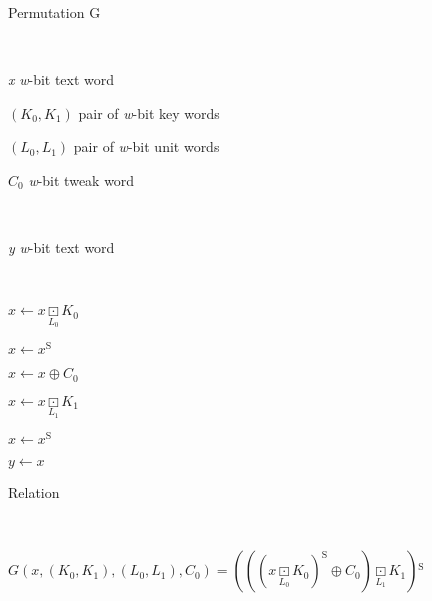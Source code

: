 \documentclass[a4paper,oneside,english]{amsart}
\numberwithin{equation}{section}
\numberwithin{figure}{section}
\newenvironment{lyxlist}[1]
{\begin{list}{}
{\settowidth{\labelwidth}{#1}
 \setlength{\leftmargin}{\labelwidth}
 \addtolength{\leftmargin}{\labelsep}
 \renewcommand{\makelabel}[1]{##1\hfil}}}
{\end{list}}
\newenvironment{lyxcode}
{\par\begin{list}{}{
\setlength{\rightmargin}{\leftmargin}
\setlength{\listparindent}{0pt}\raggedright
\setlength{\itemsep}{0pt}
\setlength{\parsep}{0pt}
\normalfont\ttfamily}\item[]}
{\end{list}}
\begin{document}
\begin{algorithm}
\caption{\label{alg:Permutation-G}Permutation G}

\begin{description}
\item [{Input}]~

\begin{lyxlist}{00.00.0000}
\item [{\emph{x}}] \emph{w}-bit text word
\item [{$(K_{0},K_{1})$}] pair of \emph{w}-bit key words
\item [{$(L_{0},L_{1})$}] pair of \emph{w}-bit unit words
\item [{$C_{0}$}] \emph{w}-bit tweak word
\end{lyxlist}
\item [{Output}]~

\begin{lyxlist}{00.00.0000}
\item [{\emph{y}}] \emph{w}-bit text word
\end{lyxlist}
\item [{Pseudo-code}]~\end{description}
\begin{lyxcode}
$x\leftarrow x\underset{L_{0}}{\boxdot}K_{0}$

$x\leftarrow x^{\mathrm{S}}$

$x\leftarrow x\oplus C_{0}$

$x\leftarrow x\underset{L_{1}}{\boxdot}K_{1}$

$x\leftarrow x^{\mathrm{S}}$

$y\leftarrow x$\end{lyxcode}
\begin{description}
\item [{Relation}]~\end{description}
\begin{lyxcode}
$G(x,(K_{0},K_{1}),(L_{0},L_{1}),C_{0})=(((x\underset{L_{0}}{\boxdot}K_{0})^{\mathrm{S}}\oplus C_{0})\underset{L_{1}}{\boxdot}K_{1})\mathrm{^{S}}$\end{lyxcode}
\end{algorithm}
\end{document}
